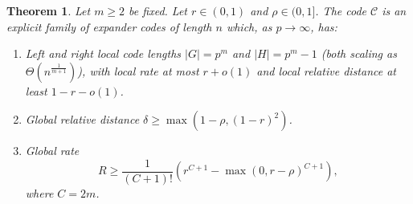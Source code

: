 \documentclass[11pt]{article}
\theoremstyle{plain}
\newtheorem{theorem}{Theorem}[section]
\theoremstyle{definition}
\begin{document}
\begin{theorem}
\label{thm:optimized_construction}
Let $m \ge 2$ be fixed. Let $r \in (0, 1)$ and $\rho \in (0, 1]$. The code $\mathcal{C}$ is an explicit family of expander codes of length $n$ which, as $p \to \infty$, has:
\begin{enumerate}
    \item Left and right local code lengths $|G| = p^m$ and $|H| = p^m-1$ (both scaling as $\Theta(n^{\frac{1}{m+1}})$), with local rate at most $r+o(1)$ and local relative distance at least $1-r-o(1)$.
    \item Global relative distance $\delta \ge \max(1-\rho, (1-r)^2)$.
    \item Global rate 
    \[ R \ge \frac{1}{(C+1)!} \left(r^{C+1} - \max(0, r-\rho)^{C+1}\right), \] 
    where $C=2m$.
\end{enumerate}
\end{theorem}
\end{document}
